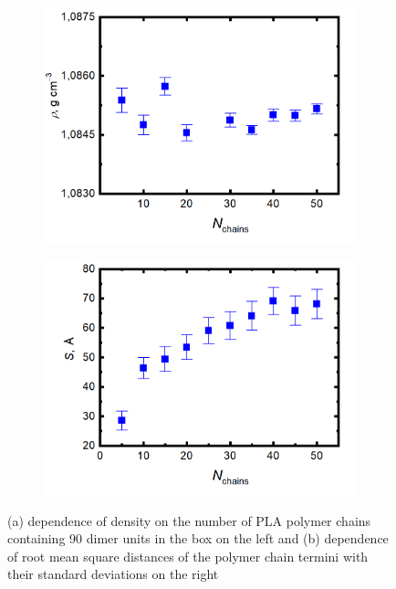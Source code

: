 \begin{figure}[htb!]
	\begin{subfigure}{0.5\textwidth}
		\centering
		\includegraphics[width=1\linewidth]{img/hustota_5_50_sigma.png}
		\caption{}
		\label{fig:box}
	\end{subfigure}
	\begin{subfigure}{0.5\textwidth}
		\centering
		\includegraphics[width=1\linewidth]{img/konce_5_50.png}
		\caption{}
		\label{fig:box_konce}
	\end{subfigure}   	
	\caption{(a) dependence of density on the number of PLA polymer chains containing 90 dimer units in the box on the left and (b) dependence of root mean square distances of the polymer chain termini with their standard deviations on the right}
	\vspace{-0.2cm}
\end{figure}

